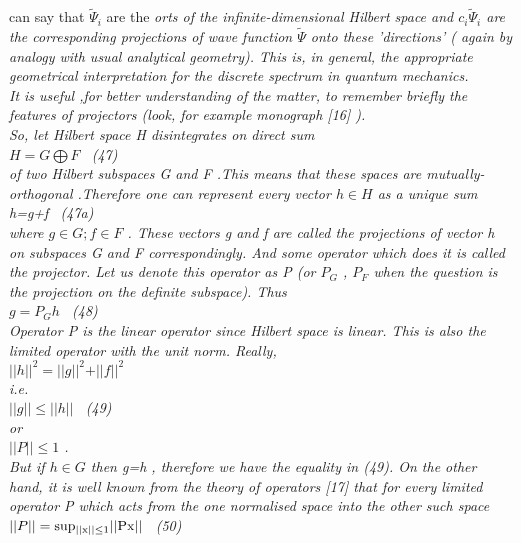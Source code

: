 \documentclass[a4paper,12pt] {article}
\begin{document}
{can say that  $ \tilde \Psi_i $  are the \it orts \rm of the infinite-dimensional   Hilbert  space and
 $ c_i \tilde \Psi_i $  are the
 corresponding  \it projections \rm of wave function $ \tilde \Psi $ onto these 'directions' ( again by
analogy with usual analytical geometry). This is, in general,  the appropriate geometrical interpretation
 for the discrete spectrum in quantum mechanics.\\ It is useful ,for  better understanding of the matter, to
 remember briefly the features of projectors (look, for example monograph [16] ). \\
So, let Hilbert space H disintegrates on direct sum  \\$ H=  G \bigoplus F $  \ (47) \\ of two Hilbert
subspaces G and F  .This means that these spaces are   mutually-orthogonal .Therefore one can represent
 \it  every vector  $ h \in H $  as a \it unique sum \rm
 \\ h=g+f  \ (47a)
\\where  $ g  \in G ; f \in F $ . These vectors g and f are called the \it projections of vector \rm  h
 \it  on subspaces \rm  G  \it and \rm  F    correspondingly. And some operator which does  it is called
 \it the projector. \rm  Let us denote this  operator as P (or $ P_G $ , $ P_F $ when the question is the
projection on the definite subspace). Thus \\$ g=P_G h$  \ (48)
\\ Operator P is  \it  the linear  operator \rm  since Hilbert space is linear. This is also the  \it  limited \rm
operator with the \it unit \rm  norm. Really, \\$ \vert \vert h\vert \vert^2 = \vert \vert g \vert \vert^2 +
 \vert \vert  f\vert \vert ^2 $ \\i.e. \\ $\vert \vert g \vert \vert \leq\vert \vert h\vert \vert $ \ (49)
 \\ or \\ $\vert \vert P\vert \vert \leq 1$ .
\\ But if  $ h\in G $  then g=h , therefore we have the   \it equality \rm in (49). On the other hand, it is well
 known from the theory of operators [17] that  \it  for every limited operator \rm P \it  which acts from the
 one normalised space into the other such space
 \\$ \vert \vert P\vert \vert = \rm sup _{ \vert \vert x \vert \vert \leq 1} \vert \vert Px\vert \vert $ \ \rm (50) \\
}
\end{document}
